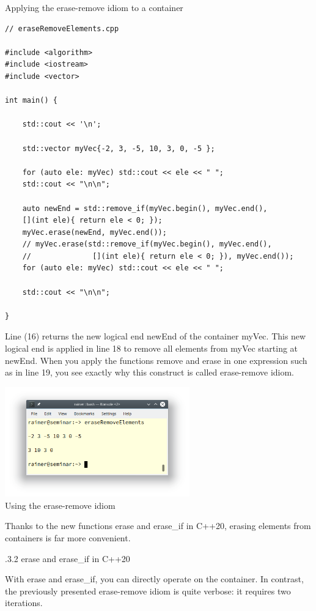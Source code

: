 \noindent
Applying the erase-remove idiom to a container
\begin{lstlisting}[style=styleCXX]
// eraseRemoveElements.cpp

#include <algorithm>
#include <iostream>
#include <vector>

int main() {
	
	std::cout << '\n';
	
	std::vector myVec{-2, 3, -5, 10, 3, 0, -5 };
	
	for (auto ele: myVec) std::cout << ele << " ";
	std::cout << "\n\n";
	
	auto newEnd = std::remove_if(myVec.begin(), myVec.end(),
	[](int ele){ return ele < 0; });
	myVec.erase(newEnd, myVec.end());
	// myVec.erase(std::remove_if(myVec.begin(), myVec.end(),
	//              [](int ele){ return ele < 0; }), myVec.end());
	for (auto ele: myVec) std::cout << ele << " ";
	
	std::cout << "\n\n";

}
\end{lstlisting}

Line (16) returns the new logical end newEnd of the container myVec. This new logical end is applied in line 18 to remove all elements from myVec starting at newEnd. When you apply the functions remove and erase in one expression such as in line 19, you see exactly why this construct is called erase-remove idiom.

\begin{center}
\includegraphics[width=0.6\textwidth]{content/3/chapter5/images/12.png}\\
Using the erase-remove idiom
\end{center}

Thanks to the new functions erase and erase\_if in C++20, erasing elements from containers is far more convenient.

.3.2\hspace{0.2cm}  erase and erase\_if in C++20

With erase and erase\_if, you can directly operate on the container. In contrast, the previously presented erase-remove idiom is quite verbose: it requires two iterations.

